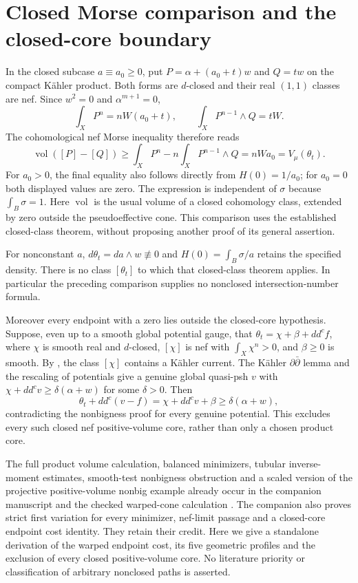 \documentclass[11pt]{article}
\newcommand{\ddc}{dd^c}
\theoremstyle{remark}\newtheorem{remark}[theorem]{Remark}
\begin{document}
\section{Closed Morse comparison and the closed-core boundary}
In the closed subcase $a\equiv a_0\geq0$, put
$P=\alpha+(a_0+t)w$ and $Q=tw$ on the compact K\"ahler product.
Both forms are $d$-closed and their real $(1,1)$ classes are nef.
Since $w^2=0$ and $\alpha^{m+1}=0$,
\[
 \int_X P^n=nW(a_0+t),\qquad
 \int_X P^{n-1}\wedge Q=tW.
\]
The cohomological nef Morse inequality
\cite[Theorem 1.1]{Morse} therefore reads
\[
 \operatorname{vol}([P]-[Q])\geq
 \int_XP^n-n\int_XP^{n-1}\wedge Q
 =nWa_0=V_\mu(\theta_t).
\]
For $a_0>0$, the final equality also follows directly from
$H(0)=1/a_0$; for $a_0=0$ both displayed values are zero.
The expression is independent of $\sigma$ because $\int_B\sigma=1$.
Here $\operatorname{vol}$ is the usual volume of a closed cohomology
class, extended by zero outside the pseudoeffective cone.
This comparison uses the established closed-class theorem, without
proposing another proof of its general assertion.

For nonconstant $a$, $d\theta_t=da\wedge w\not\equiv0$ and
$H(0)=\int_B\sigma/a$ retains the specified density.
There is no class $[\theta_t]$ to which that closed-class theorem applies.
In particular the preceding comparison supplies no nonclosed
intersection-number formula.

Moreover every endpoint with a zero lies outside the closed-core
hypothesis. Suppose, even up to a smooth global potential gauge, that
$\theta_t=\chi+\beta+\ddc f$, where $\chi$ is smooth real and
$d$-closed, $[\chi]$ is nef with $\int_X\chi^n>0$, and
$\beta\geq0$ is smooth. By \cite[Theorem 2.12]{DP}, the class
$[\chi]$ contains a K\"ahler current. The K\"ahler
$\partial\bar\partial$ lemma and the rescaling of potentials give a
genuine global quasi-psh $v$ with
$\chi+\ddc v\geq\delta(\alpha+w)$ for some $\delta>0$.
Then
\[
 \theta_t+\ddc(v-f)=\chi+\ddc v+\beta
 \geq\delta(\alpha+w),
\]
contradicting the nonbigness proof for every genuine potential.
This excludes every such closed nef positive-volume core, rather than
only a chosen product core.

The full product volume calculation, balanced minimizers, tubular
inverse-moment estimates, smooth-test nonbigness obstruction and a scaled
version of the projective positive-volume nonbig example already occur
in the companion manuscript and the checked warped-cone calculation
\cite{Companion}. The companion also proves strict first variation for
every minimizer, nef-limit passage and a closed-core endpoint cost identity.
They retain their credit. Here we give a standalone derivation of the
warped endpoint cost, its five geometric profiles and the exclusion of
every closed positive-volume core. No literature priority or classification
of arbitrary nonclosed paths is asserted.
\end{document}
